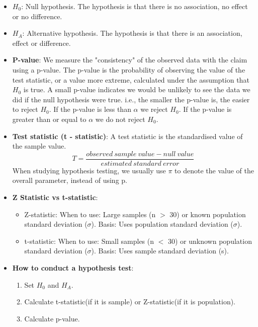 \documentclass[12pt]{book}
\begin{document}
\newpage

\pagestyle{fancy}

\begin{itemize}
\item \textbf{$H_0$}: Null hypothesis. The hypothesis is that there is no association, no effect or no difference.
\item \textbf{$H_A$}: Alternative hypothesis. The hypothesis is that there is an association, effect or difference.
\item \textbf{P-value}: We measure the "consistency" of the observed data with the claim using a p-value. The p-value is the probability of observing the value of the test statistic, or a value more extreme, calculated under the assumption that $H_0$ is true. A small p-value indicates we would be unlikely to see the data we did if the null hypothesis were true. i.e., the smaller the p-value is, the easier to reject $H_0$. If the p-value is less than $\alpha$ we reject $H_0$. If the p-value is greater than or equal to $\alpha$ we do not reject $H_0$.
\item \textbf{Test statistic (t - statistic)}: A test statistic is the standardised value of the sample value. 
$$T = \frac{observed \ sample \ value - null \ value}{estimated \ standard \ error}$$
When studying hypothesis testing, we usually use $\pi$ to denote the value of the overall parameter, instead of using p.
\item \textbf{Z Statistic vs t-statistic}:
\begin{itemize}
\item Z-statistic: When to use: Large samples (n $>$ 30) or known population standard deviation ($\sigma$). Basis: Uses population standard deviation ($\sigma$).
\item t-statistic: When to use: Small samples (n $<$ 30) or unknown population standard deviation ($\sigma$). Basis: Uses sample standard deviation (s).
\end{itemize}
\item \textbf{How to conduct a hypothesis test}:
\begin{enumerate}
\item Set $H_0$ and $H_A$.
\item Calculate t-statistic(if it is sample) or Z-statistic(if it is population).
\item Calculate p-value.

\end{enumerate}
\end{itemize}
\end{document}
